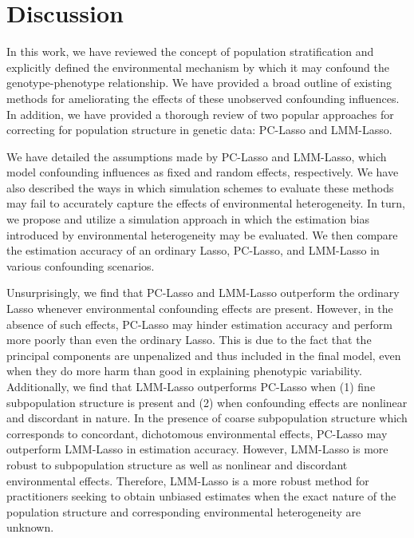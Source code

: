 \section{Discussion} \label{sec:discussion}

In this work, we have reviewed the concept of population stratification and explicitly defined the environmental mechanism by which it may confound the genotype-phenotype relationship. We have provided a broad outline of existing methods for ameliorating the effects of these unobserved confounding influences. In addition, we have provided a thorough review of two popular approaches for correcting for population structure in genetic data: PC-Lasso and LMM-Lasso. 

We have detailed the assumptions made by PC-Lasso and LMM-Lasso, which model confounding influences as fixed and random effects, respectively. We have also described the ways in which simulation schemes to evaluate these methods may fail to accurately capture the effects of environmental heterogeneity. In turn, we propose and utilize a simulation approach in which the estimation bias introduced by environmental heterogeneity may be evaluated. We then compare the estimation accuracy of an ordinary Lasso, PC-Lasso, and LMM-Lasso in various confounding scenarios.

Unsurprisingly, we find that PC-Lasso and LMM-Lasso outperform the ordinary Lasso whenever environmental confounding effects are present. However, in the absence of such effects, PC-Lasso may hinder estimation accuracy and perform more poorly than even the ordinary Lasso. This is due to the fact that the principal components are unpenalized and thus included in the final model, even when they do more harm than good in explaining phenotypic variability. Additionally, we find that LMM-Lasso outperforms PC-Lasso when (1) fine subpopulation structure is present and (2) when confounding effects are nonlinear and discordant in nature. In the presence of coarse subpopulation structure which corresponds to concordant, dichotomous environmental effects, PC-Lasso may outperform LMM-Lasso in estimation accuracy. However, LMM-Lasso is more robust to subpopulation structure as well as nonlinear and discordant environmental effects. Therefore, LMM-Lasso is a more robust method for practitioners seeking to obtain unbiased estimates when the exact nature of the population structure and corresponding environmental heterogeneity are unknown.  


